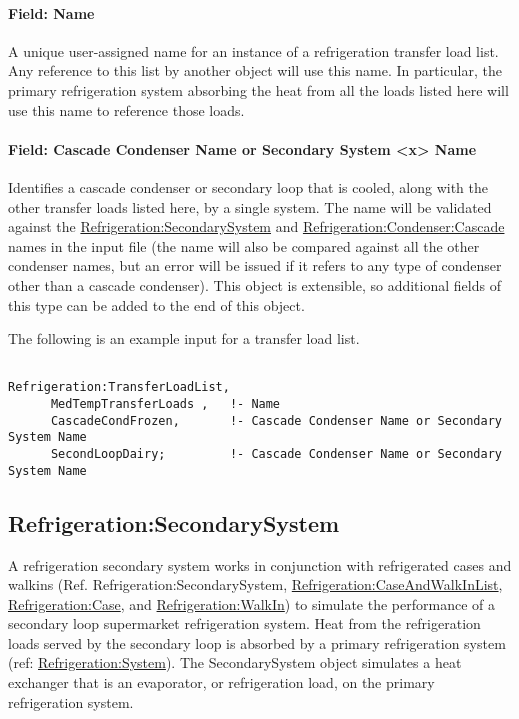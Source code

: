 \paragraph{Field: Name}\label{field-name-14-007}

A unique user-assigned name for an instance of a refrigeration transfer load list. Any reference to this list by another object will use this name. In particular, the primary refrigeration system absorbing the heat from all the loads listed here will use this name to reference those loads.

\paragraph{Field: Cascade Condenser Name or Secondary System \textless{}x\textgreater{} Name}\label{field-cascade-condenser-name-or-secondary-system-name}

Identifies a cascade condenser or secondary loop that is cooled, along with the other transfer loads listed here, by a single system. The name will be validated against the \hyperref[refrigerationsecondarysystem]{Refrigeration:SecondarySystem} and \hyperref[refrigerationcondensercascade]{Refrigeration:Condenser:Cascade} names in the input file (the name will also be compared against all the other condenser names, but an error will be issued if it refers to any type of condenser other than a cascade condenser).  This object is extensible, so additional fields of this type can be added to the end of this object.

The following is an example input for a transfer load list.

\begin{lstlisting}

Refrigeration:TransferLoadList,
      MedTempTransferLoads ,   !- Name
      CascadeCondFrozen,       !- Cascade Condenser Name or Secondary System Name
      SecondLoopDairy;         !- Cascade Condenser Name or Secondary System Name
\end{lstlisting}

\subsection{Refrigeration:SecondarySystem}\label{refrigerationsecondarysystem}

A refrigeration secondary system works in conjunction with refrigerated cases and walkins (Ref. Refrigeration:SecondarySystem, \hyperref[refrigerationcaseandwalkinlist]{Refrigeration:CaseAndWalkInList}, \hyperref[refrigerationcase]{Refrigeration:Case}, and \hyperref[refrigerationwalkin]{Refrigeration:WalkIn}) to simulate the performance of a secondary loop supermarket refrigeration system. Heat from the refrigeration loads served by the secondary loop is absorbed by a primary refrigeration system (ref: \hyperref[refrigerationsystem]{Refrigeration:System}). The SecondarySystem object simulates a heat exchanger that is an evaporator, or refrigeration load, on the primary refrigeration system.

